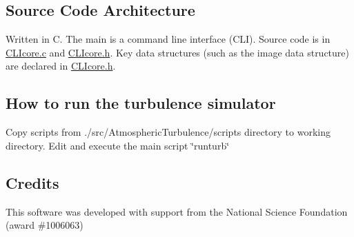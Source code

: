 \subsection*{Source Code Architecture}

Written in C. The main is a command line interface (C\+L\+I). Source code is in \hyperlink{CLIcore_8c}{C\+L\+Icore.\+c} and \hyperlink{CLIcore_8h}{C\+L\+Icore.\+h}. Key data structures (such as the image data structure) are declared in \hyperlink{CLIcore_8h}{C\+L\+Icore.\+h}.

\subsection*{How to run the turbulence simulator}

Copy scripts from ./src/\+Atmospheric\+Turbulence/scripts directory to working directory. Edit and execute the main script \char`\"{}runturb\char`\"{}

\subsection*{Credits}

This software was developed with support from the National Science Foundation (award \#1006063) 
